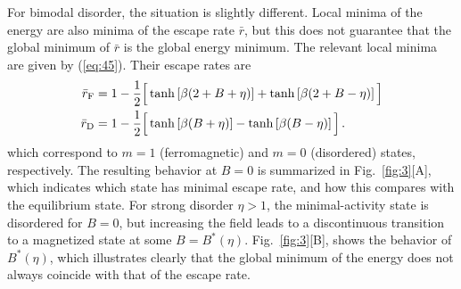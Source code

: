 \documentclass{iopart}
\begin{document}
For bimodal disorder, the situation is slightly different.  Local minima of the energy are also minima of the escape rate $\bar r$, but this does not guarantee that the global minimum of $\bar r$ is the global energy minimum.  The relevant local minima are given by (\ref{eq:45}).  Their escape rates are
\begin{eqnarray}
  \label{eq:16}
    \bar{r}_{\rm F} &= 1 - \frac{1}{2}\Big[\tanh\left[\beta(2+B+\eta)\right] + \tanh\left[\beta(2+B-\eta)\right] \Big] \\
        \bar{r}_{\rm D} &= 1 - \frac{1}{2}\Big[\tanh\left[\beta(B+\eta)\right] - \tanh\left[\beta(B-\eta)\right] \Big] \, .
\end{eqnarray}
which correspond to $m=1$ (ferromagnetic) and $m=0$ (disordered) states, respectively.
The resulting behavior at $B=0$ is summarized in Fig.~\ref{fig:3}[A], which indicates which state has minimal escape rate, and how this compares with the equilibrium state. For strong disorder $\eta>1$, the minimal-activity state is disordered for $B=0$, but increasing the field leads to a discontinuous transition to a magnetized state at some $B=B^{\ast}(\eta)$.
Fig.~\ref{fig:3}[B], shows the behavior of $B^{\ast}(\eta)$, which illustrates clearly that the global minimum of the energy does not always coincide with that of the escape rate.
\end{document}

